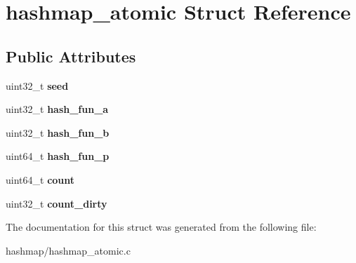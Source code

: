 \hypertarget{structhashmap__atomic}{}\section{hashmap\+\_\+atomic Struct Reference}
\label{structhashmap__atomic}
\subsection*{Public Attributes}
\begin{DoxyCompactItemize}
\item 
\mbox{\label{structhashmap__atomic_a83e3b765935189ca4a6bf0c0e33c8d09}} 
uint32\+\_\+t {\bfseries seed}
\item 
\mbox{\label{structhashmap__atomic_a95d74f846934cb275183a28df0ff14a8}} 
uint32\+\_\+t {\bfseries hash\+\_\+fun\+\_\+a}
\item 
\mbox{\label{structhashmap__atomic_aa2476a3fa7d4d13c4b4d83d80ee1bb4c}} 
uint32\+\_\+t {\bfseries hash\+\_\+fun\+\_\+b}
\item 
\mbox{\label{structhashmap__atomic_ae9459faea29e49b192e2c2d8e59d235d}} 
uint64\+\_\+t {\bfseries hash\+\_\+fun\+\_\+p}
\item 
\mbox{\label{structhashmap__atomic_adb45831ae8cc7d5335b048ccc0ba2009}} 
uint64\+\_\+t {\bfseries count}
\item 
\mbox{\label{structhashmap__atomic_a4e9b4e9443278085568203af85278e6f}} 
uint32\+\_\+t {\bfseries count\+\_\+dirty}
\end{DoxyCompactItemize}


The documentation for this struct was generated from the following file\+:\begin{DoxyCompactItemize}
\item 
hashmap/hashmap\+\_\+atomic.\+c\end{DoxyCompactItemize}
